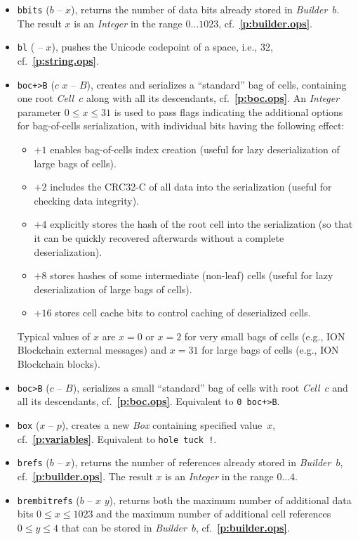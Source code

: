 \documentclass[12pt,oneside]{article}
\def\refpoint#1{{\rm\textbf{\ref{#1}}}}
\let\ptref=\refpoint
\begin{document}
\begin{itemize}
\item {\tt bbits} ($b$ -- $x$), returns the number of data bits already stored in {\em Builder\/}~$b$. The result $x$ is an {\em Integer\/} in the range $0\dots1023$, cf.~\ptref{p:builder.ops}.
\item {\tt bl} ( -- $x$), pushes the Unicode codepoint of a space, i.e., 32, cf.~\ptref{p:string.ops}.
\item {\tt boc+>B} ($c$ $x$ -- $B$), creates and serializes a ``standard'' bag of cells, containing one root {\em Cell\/}~$c$ along with all its descendants, cf.~\ptref{p:boc.ops}. An {\em Integer\/} parameter $0\leq x\leq 31$ is used to pass flags indicating the additional options for bag-of-cells serialization, with individual bits having the following effect:
  \begin{itemize}
  \item $+1$ enables bag-of-cells index creation (useful for lazy deserialization of large bags of cells).
  \item $+2$ includes the CRC32-C of all data into the serialization (useful for checking data integrity).
  \item $+4$ explicitly stores the hash of the root cell into the serialization (so that it can be quickly recovered afterwards without a complete deserialization).
  \item $+8$ stores hashes of some intermediate (non-leaf) cells (useful for lazy deserialization of large bags of cells).
  \item $+16$ stores cell cache bits to control caching of deserialized cells.
  \end{itemize}
Typical values of $x$ are $x=0$ or $x=2$ for very small bags of cells (e.g., ION Blockchain external messages) and $x=31$ for large bags of cells (e.g., ION Blockchain blocks).
\item {\tt boc>B} ($c$ -- $B$), serializes a small ``standard'' bag of cells with root {\em Cell\/}~$c$ and all its descendants, cf.~\ptref{p:boc.ops}. Equivalent to {\tt 0 boc+>B}.
\item {\tt box} ($x$ -- $p$), creates a new {\em Box\/} containing specified value~$x$, cf.~\ptref{p:variables}. Equivalent to {\tt hole tuck !}.
\item {\tt brefs} ($b$ -- $x$), returns the number of references already stored in {\em Builder\/}~$b$, cf.~\ptref{p:builder.ops}. The result $x$ is an {\em Integer\/} in the range $0\dots4$.
\item {\tt brembitrefs} ($b$ -- $x$ $y$), returns both the maximum number of additional data bits $0\leq x\leq 1023$ and the maximum number of additional cell references $0\leq y\leq 4$ that can be stored in {\em Builder\/}~$b$, cf.~\ptref{p:builder.ops}.

\end{itemize}
\end{document}
